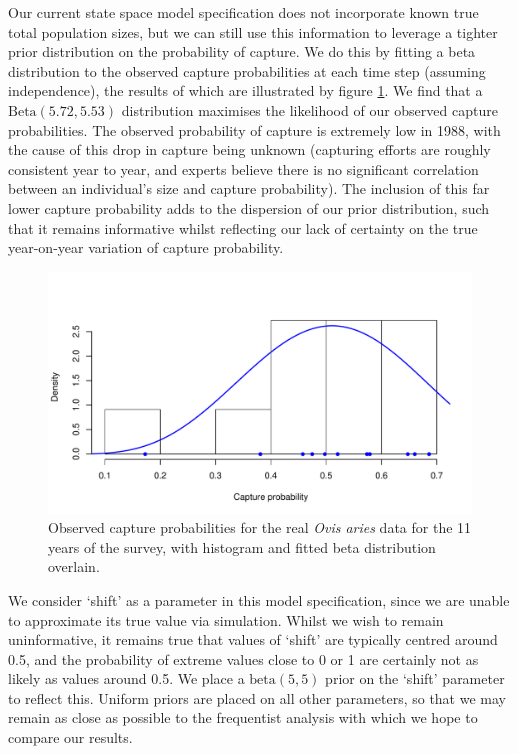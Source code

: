 \documentclass[a4paper,12pt]{article}
\begin{document}
Our current state space model specification does not incorporate known true total population sizes, but we can still use this information to leverage a tighter prior distribution on the probability of capture. We do this by fitting a beta distribution to the observed capture probabilities at each time step (assuming independence), the results of which are illustrated by figure \ref{sheepCP}. We find that a $\text{Beta}(5.72, 5.53)$ distribution maximises the likelihood of our observed capture probabilities. The observed probability of capture is extremely low in 1988, with the cause of this drop in capture being unknown (capturing efforts are roughly consistent year to year, and experts believe there is no significant correlation between an individual's size and capture probability). The inclusion of this far lower capture probability adds to the dispersion of our prior distribution, such that it remains informative whilst reflecting our lack of certainty on the true year-on-year variation of capture probability.

\begin{figure}[H]
\centering
\includegraphics[scale=0.8]{captureProb.pdf}
\caption{\label{sheepCP}Observed capture probabilities for the real \textit{Ovis aries} data for the 11 years of the survey, with histogram and fitted beta distribution overlain.}
\end{figure}

We consider `shift' as a parameter in this model specification, since we are unable to approximate its true value via simulation. Whilst we wish to remain uninformative, it remains true that values of `shift' are typically centred around 0.5, and the probability of extreme values close to 0 or 1 are certainly not as likely as values around 0.5. We place a $\text{beta}(5, 5)$ prior on the `shift' parameter to reflect this. Uniform priors are placed on all other parameters, so that we may remain as close as possible to the frequentist analysis with which we hope to compare our results.
\end{document}

